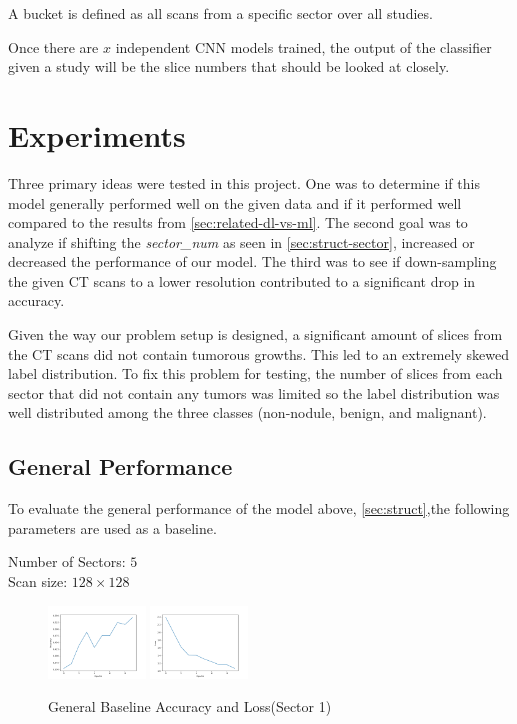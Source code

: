 \documentclass[10pt,twocolumn,letterpaper]{article}
\begin{document}
        A bucket is defined as all scans from a specific sector over all studies.

        Once there are $x$ independent CNN models trained, the output of the classifier given a study will
        be the slice numbers that should be looked at closely.

\section{Experiments} \label{sec:experiments}
   Three primary ideas were tested in this project. One was to determine if this model generally performed well on the given data and if it performed well
   compared to the results from \ref{sec:related-dl-vs-ml}. The second goal was to analyze if shifting the
   {\it sector\_num} as seen in \ref{sec:struct-sector}, increased or decreased the performance of our model. The third was to see if down-sampling the
   given CT scans to a lower resolution contributed to a significant drop in accuracy.

   Given the way our problem setup is designed, a significant amount of slices from the CT scans did not contain tumorous growths. This led to an extremely
   skewed label distribution. To fix this problem for testing, the number of slices from each sector that did not contain any tumors was limited so the label
   distribution was well distributed among the three classes (non-nodule, benign, and malignant).

   \subsection{General Performance} \label{sec:experiments-general-performance}
      To evaluate the general performance of the model above, \ref{sec:struct},the following parameters are used as a baseline.

      \begin{center}
         Number of Sectors: $5$ \\
         Scan size: $128 \times 128$
      \end{center}

      \begin{figure}[h]
         \centering
         \includegraphics[width=0.23\textwidth]{./images/training_accuracy_5_sector_128_px.png}
         \includegraphics[width=0.23\textwidth]{./images/training_loss_5_sector_128_px.png}
         \caption{General Baseline Accuracy and Loss(Sector 1)}
         \label{fig:experiments-general-acc-loss}
      \end{figure}
\end{document}
